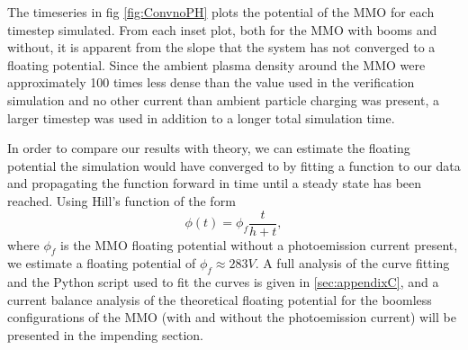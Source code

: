 The timeseries in fig \ref{fig:ConvnoPH} plots the potential of the MMO for each timestep simulated. From each inset plot, both for the MMO with booms and without, it is apparent from the slope that the system has not converged to a floating potential. Since the ambient plasma density around the MMO were approximately 100 times less dense than the value used in the verification simulation and no other current than ambient particle charging was present, a larger timestep was used in addition to a longer total simulation time. 

In order to compare our results with theory, we can estimate the floating potential the simulation would have converged to by fitting a function to our data and propagating the function forward in time until a steady state has been reached. Using Hill's function of the form 
\begin{equation*}
    \phi(t) = \phi_f \frac{t}{h + t},
\end{equation*}
where $\phi_f$ is the MMO floating potential without a photoemission current present, we estimate a floating potential of $\phi_f \approx 283 V$. A full analysis of the curve fitting and the Python script used to fit the curves is given in  \cref{sec:appendixC}, and a current balance analysis of the theoretical floating potential for the boomless configurations of the MMO (with and without the photoemission current) will be presented in the impending section. 


